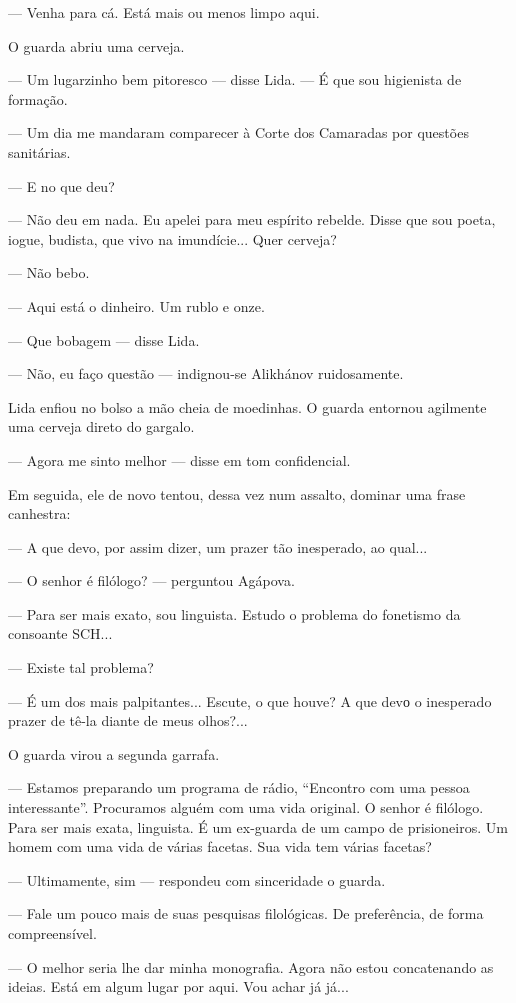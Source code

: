 --- Venha para cá. Está mais ou menos limpo aqui.

O guarda abriu uma cerveja.

--- Um lugarzinho bem pitoresco --- disse Lida. --- É que sou higienista
de formação.

--- Um dia me mandaram comparecer à Corte dos Camaradas por questões
sanitárias.

--- E no que deu?

--- Não deu em nada. Eu apelei para meu espírito rebelde. Disse que sou
poeta, iogue, budista, que vivo na imundície... Quer cerveja?

--- Não bebo.

--- Aqui está o dinheiro. Um rublo e onze.

--- Que bobagem --- disse Lida.

--- Não, eu faço questão --- indignou-se Alikhánov ruidosamente.

Lida enfiou no bolso a mão cheia de moedinhas. O guarda entornou
agilmente uma cerveja direto do gargalo.

--- Agora me sinto melhor --- disse em tom confidencial.

Em seguida, ele de novo tentou, dessa vez num assalto, dominar uma frase
canhestra:

--- A que devo, por assim dizer, um prazer tão inesperado, ao qual...

--- O senhor é filólogo? --- perguntou Agápova.

--- Para ser mais exato, sou linguista. Estudo o problema do fonetismo
da consoante SCH...

--- Existe tal problema?

--- É um dos mais palpitantes... Escute, o que houve? A que devо o
inesperado prazer de tê-la diante de meus olhos?...

O guarda virou a segunda garrafa.

--- Estamos preparando um programa de rádio, ``Encontro com uma pessoa
interessante''. Procuramos alguém com uma vida original. O senhor é
filólogo. Para ser mais exata, linguista. É um ex-guarda de um campo de
prisioneiros. Um homem com uma vida de várias facetas. Sua vida tem
várias facetas?

--- Ultimamente, sim --- respondeu com sinceridade o guarda.

--- Fale um pouco mais de suas pesquisas filológicas. De preferência, de
forma compreensível.

--- O melhor seria lhe dar minha monografia. Agora não estou
concatenando as ideias. Está em algum lugar por aqui. Vou achar já já...

